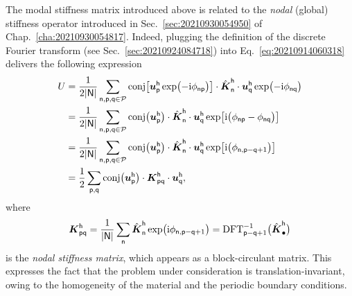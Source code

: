 The modal stiffness matrix introduced above is related to the \emph{nodal}
(global) stiffness operator introduced in Sec.~\ref{sec:20210930054950} of
Chap.~\ref{cha:20210930054817}. Indeed, plugging the definition of the discrete
Fourier transform (see Sec.~\ref{sec:20210924084718}) into
Eq. \eqref{eq:20210914060318} delivers the following expression
\begin{equation}
  \begin{aligned}[b]
    U={}&\frac1{2\lvert\mathsf{N}\rvert}\sum_{\mathsf{n}, \mathsf{p}, \mathsf{q}\in\mathcal{P}}
    \operatorname{conj}\bigl[\boldsymbol u_\mathsf{p}^\mathsf{h}\exp\bigl(-\mathrm i\phi_\mathsf{np}\bigr)\bigr]
    \cdot\hat{\boldsymbol K}_\mathsf{n}^\mathsf{h}
    \cdot\boldsymbol u_\mathsf{q}^\mathsf{h}\exp\bigl(-\mathrm i\phi_\mathsf{nq}\bigr)\\
    ={}&\frac1{2\lvert\mathsf{N}\rvert}\sum_{\mathsf{n}, \mathsf{p}, \mathsf{q}\in\mathcal{P}}
    \operatorname{conj}\bigl(\boldsymbol u_\mathsf{p}^\mathsf{h}\bigr)
    \cdot\hat{\boldsymbol K}_\mathsf{n}^\mathsf{h}
    \cdot\boldsymbol u_\mathsf{q}^\mathsf{h}
    \exp\bigl[\mathrm i\bigl(\phi_\mathsf{np}-\phi_\mathsf{nq}\bigr)\bigr]\\
    ={}&\frac1{2\lvert\mathsf{N}\rvert}\sum_{\mathsf{n}, \mathsf{p}, \mathsf{q}\in\mathcal{P}}
    \operatorname{conj}\bigl(\boldsymbol u_\mathsf{p}^\mathsf{h}\bigr)
    \cdot\hat{\boldsymbol K}_\mathsf{n}^\mathsf{h}
    \cdot\boldsymbol u_\mathsf{q}^\mathsf{h}
    \exp\bigl[\mathrm i\bigl(\phi_{\mathsf{n}, \mathsf{p}-\mathsf{q}+1}\bigr)\bigr]\\
    ={}&\frac12\sum_{\mathsf{p},\mathsf{q}}
    \operatorname{conj}\bigl(\boldsymbol u_\mathsf{p}^\mathsf{h}\bigr)\cdot\boldsymbol K_\mathsf{pq}^\mathsf{h}
    \cdot\boldsymbol u_\mathsf{q}^\mathsf{h},
  \end{aligned}
\end{equation}
where
\begin{equation}
  \boldsymbol{K}_{\mathsf{pq}}^\mathsf{h}
  =\frac1{\lvert\mathsf{N}\rvert}\sum_{\mathsf{n}}
  \hat{\boldsymbol K}_\mathsf{n}^\mathsf{h}
  \exp\bigl(\mathrm i\phi_{\mathsf{n},\mathsf{p}-\mathsf{q}+1}\bigr)
  =\operatorname{DFT}_{\mathsf{p}-\mathsf{q}+1}^{-1}\bigl(\hat{\boldsymbol K}_\mathsf{\bullet}^\mathsf{h}\bigr)
\end{equation}
is the \emph{nodal stiffness matrix}, which appears as a block-circulant
matrix. This expresses the fact that the problem under consideration is
translation-invariant, owing to the homogeneity of the material and the periodic
boundary conditions.

